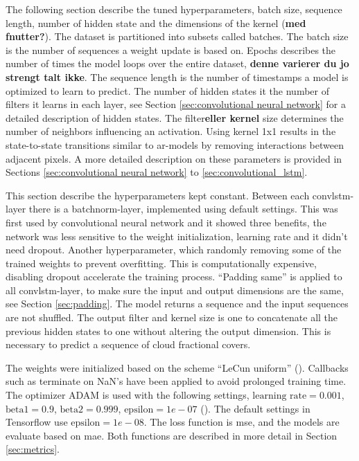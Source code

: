 The following section describe the tuned hyperparameters, batch size, sequence length, number of hidden state and the dimensions of the kernel (\textbf{med fnutter?}). The dataset is partitioned into subsets called batches. The batch size is the number of sequences a weight update is based on. Epochs describes the number of times the model loops over the entire dataset, \textbf{denne varierer du jo strengt talt ikke}. The sequence length is the number of timestamps a model is optimized to learn to predict. The number of hidden states it the number of filters it learns in each layer, see Section \ref{sec:convolutional neural network} for a detailed description of hidden states. 
The filter\textbf{eller kernel} size determines the number of neighbors influencing an activation. Using kernel 1x1 results in the state-to-state transitions similar to \acrshort{ar}-models by removing interactions between adjacent pixels. A more detailed description on these parameters is provided in Sections \ref{sec:convolutional neural network} to \ref{sec:convolutional_lstm}. 

This section describe the hyperparameters kept constant. Between each \acrshort{convlstm}-layer there is a \acrfull{batchnorm}-layer, implemented using default settings. This was first used by  convolutional neural network and it showed three benefits, the network was less sensitive to the weight initialization, learning rate and it didn't need dropout. Another hyperparameter, which randomly removing some of the trained weights to prevent overfitting. This is computationally expensive, disabling dropout accelerate the training process.
``Padding same'' is applied to all \acrshort{convlstm}-layer, to make sure the input and output dimensions are the same, see Section \ref{sec:padding}. The model returns a sequence and the input sequences are not shuffled. The output filter and kernel size is one to concatenate all the previous hidden states to one without altering the output dimension. This is necessary to predict a sequence of cloud fractional covers. 

The weights were initialized based on the scheme ``LeCun uniform''  (\cite{Lecun98efficientbackprop}). Callbacks such as %
terminate on NaN's have been applied to avoid prolonged training time. The optimizer ADAM is used with the following settings, $\text{learning rate}=0.001$, $\text{beta1}=0.9$, $\text{beta2}=0.999$, $\text{epsilon}=1e-07$ (\cite{Kingma2015Adam:Optimization}). The default settings in Tensorflow use $\text{epsilon}=1e-08$. The loss function is \acrfull{mse}, and the models are evaluate based on \acrfull{mae}.
Both functions are described in more detail in Section \ref{sec:metrics}. %

